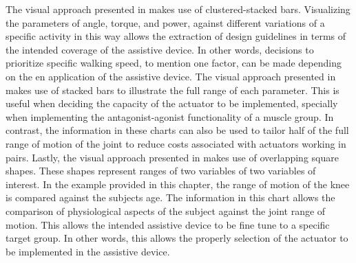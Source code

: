 The visual approach presented in  makes use of clustered-stacked bars. Visualizing the parameters of angle, torque, and power, against different variations of a specific activity in this way allows the extraction of design guidelines in terms of the intended coverage of the assistive device. In other words, decisions to prioritize specific walking speed, to mention one factor, can be made depending on the en application of the assistive device. The visual approach presented in  makes use of stacked bars to illustrate the full range of each parameter. This is useful when deciding the capacity of the actuator to be implemented, specially when implementing the antagonist-agonist functionality of a muscle group. In contrast, the information in these charts can also be used to tailor half of the full range of motion of the joint to reduce costs associated with actuators working in pairs. Lastly, the visual approach presented in  makes use of overlapping square shapes. These shapes represent ranges of two variables of two variables of interest. In the example provided in this chapter, the range of motion of the knee is compared against the subjects age. The information in this chart allows the comparison of physiological aspects of the subject against the joint range of motion. This allows the intended assistive device to be fine tune to a specific target group. In other words, this allows the properly selection of the actuator to be implemented in the assistive device.

